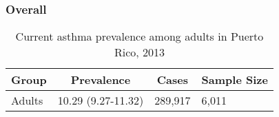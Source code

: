 


\subsubsection{Overall}




\begin{table}[H]
\caption{Current asthma prevalence among adults in Puerto Rico, 2013\label{tab:Overall.tabl.Asthma.2013}} 
\begin{center}
\begin{tabular}{llll}
\hline\hline
\multicolumn{1}{l}{Group}&\multicolumn{1}{c}{Prevalence}&\multicolumn{1}{c}{Cases}&\multicolumn{1}{c}{Sample Size}\tabularnewline
\hline
Adults&10.29 (9.27-11.32)&289,917&6,011\tabularnewline
\hline
\end{tabular}\end{center}

\end{table}




